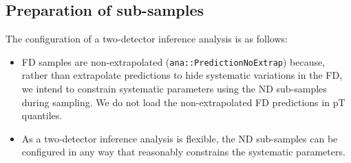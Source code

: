 \documentclass{article}
\begin{document}
\subsection{Preparation of sub-samples}
The configuration of a two-detector inference analysis is as follows:
\begin{itemize}
  \item FD samples are non-extrapolated (\texttt{ana::\-Prediction\-No\-Extrap}) because, rather than extrapolate predictions to hide systematic variations in the FD, we intend to constrain systematic parameters using the ND sub-samples during sampling. We do not load the non-extrapolated FD predictions in pT quantiles.
  \item As a two-detector inference analysis is flexible, the ND sub-samples can be configured in any way that reasonably constrains the systematic parameters.
\end{itemize}
\end{document}
